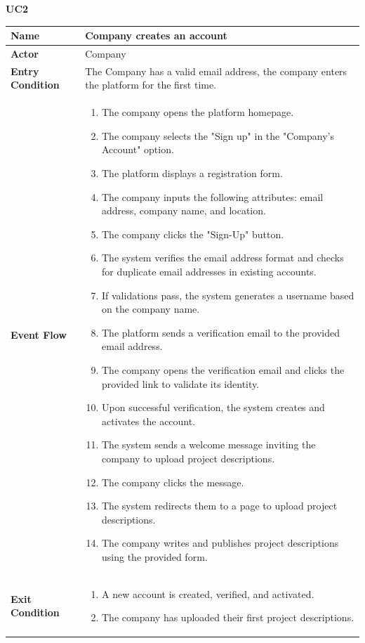 \pagebreak
\textbf{UC2}

\begin{longtable}{|p{}|p{}|}
\hline
\textbf{Name} & Company creates an account \\
\hline
\textbf{Actor} & Company\\
\hline
\textbf{Entry Condition} & The Company has a valid email address, the company enters the platform for the first time. \\
\hline
\textbf{Event Flow} & 
\begin{enumerate}
    \item The company opens the platform homepage.
    \item The company selects the "Sign up" in the "Company's Account" option.
    \item The platform displays a registration form.
    \item The company inputs the following attributes: email address, company name, and location.
    \item The company clicks the "Sign-Up" button.
    \item The system verifies the email address format and checks for duplicate email addresses in existing accounts.
    \item If validations pass, the system generates a username based on the company name.	
    \item The platform sends a verification email to the provided email address.
    \item The company opens the verification email and clicks the provided link to validate its identity.
    \item Upon successful verification, the system creates and activates the account.
    \item The system sends a welcome message inviting the company to upload project descriptions.
    \item  The company clicks the message.
    \item The system redirects them to a page to upload project descriptions.
    \item  The company writes and publishes project descriptions using the provided form.
\end{enumerate} \\
\hline
\textbf{Exit Condition} & 
\begin{enumerate}
    \item  A new account is created, verified, and activated. 
    \item  The company has uploaded their first project descriptions.

\end{enumerate}
\end{longtable}
